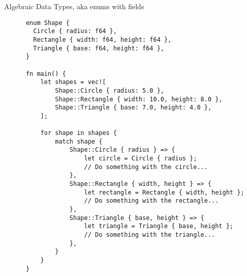\documentclass{beamer}
\begin{document}
\begin{frame}[fragile]{Algebraic Data Types, aka enums with fields}
  \begin{listing}
    \begin{verbatim}
      enum Shape {
        Circle { radius: f64 },
        Rectangle { width: f64, height: f64 },
        Triangle { base: f64, height: f64 },
      }
    
      fn main() {
          let shapes = vec![
              Shape::Circle { radius: 5.0 },
              Shape::Rectangle { width: 10.0, height: 8.0 },
              Shape::Triangle { base: 7.0, height: 4.0 },
          ];
      
          for shape in shapes {
              match shape {
                  Shape::Circle { radius } => {
                      let circle = Circle { radius };
                      // Do something with the circle...
                  },
                  Shape::Rectangle { width, height } => {
                      let rectangle = Rectangle { width, height };
                      // Do something with the rectangle...
                  },
                  Shape::Triangle { base, height } => {
                      let triangle = Triangle { base, height };
                      // Do something with the triangle...
                  },
              }
          }
      }
    \end{verbatim}
  \end{listing}
\end{frame}
\end{document}
